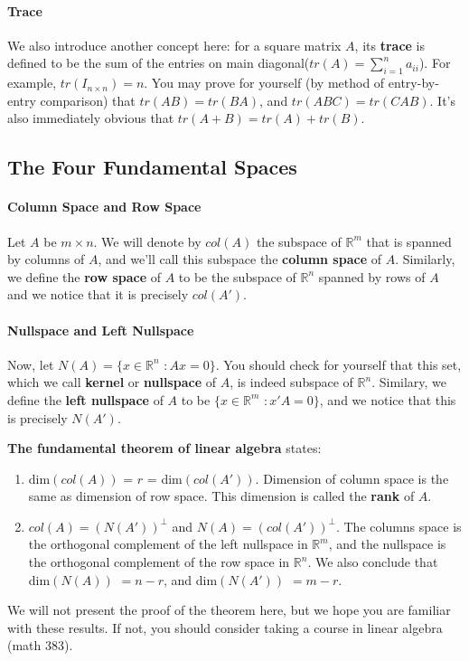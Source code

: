 \documentclass[12pt,oneside]{article}
\begin{document}
\paragraph{Trace}
We also introduce another concept here: for a square matrix $A$, its \textbf{trace} is defined to be the sum of the entries on main diagonal($tr(A) = \displaystyle\sum_{i=1}^{n} {a_{ii}}$). For example, $tr(I_{n \times n}) = n$. You may prove for yourself (by method of entry-by-entry comparison) that $tr(AB) = tr(BA)$, and $tr(ABC) = tr(CAB)$. It's also immediately obvious that $tr(A+B) = tr(A) + tr(B)$.

\subsection{The Four Fundamental Spaces}
\paragraph{Column Space and Row Space}
Let $A$ be $m \times n$. We will denote by $col(A)$ the subspace of
${\mathbb{R}}^m$ that is spanned by columns of $A$, and we'll call
this subspace the \textbf{column space} of $A$. Similarly, we define the
\textbf{row space} of $A$ to be the subspace of ${\mathbb{R}}^n$
spanned by rows of $A$ and we notice that it is precisely
$col(A')$.

\paragraph{Nullspace and Left Nullspace}
Now, let $N(A) = \{x \in {\mathbb{R}}^n$ $: Ax = 0\}$. You should
check for yourself that this set, which we call \textbf{kernel} or
\textbf{nullspace} of $A$, is indeed subspace of
${\mathbb{R}}^n$. Similary, we define the \textbf{left nullspace} of
$A$ to be $\{x \in {\mathbb{R}}^m$ $: x'A = 0\}$, and we notice that
this is precisely $N(A')$.

\textbf{The fundamental theorem of linear algebra} states:
\begin{enumerate}
\item dim$(col(A))$ = $r$ = dim$(col(A'))$. Dimension of column space
  is the same as dimension of row space. This dimension is called the
  \textbf{rank} of $A$.
\item $col(A) = {(N(A'))}^\perp$ and $N(A) = {(col(A'))}^\perp$. The
  columns space is the orthogonal complement of the left nullspace in
  ${\mathbb{R}}^m$, and the nullspace is the orthogonal complement of
  the row space in ${\mathbb{R}}^n$. We also conclude that dim$(N(A))$
  $= n - r$, and dim$(N(A'))$ $= m - r$.
\end{enumerate}
We will not present the proof of the theorem here, but we hope you are
familiar with these results. If not, you should consider taking a
course in linear algebra (math 383).
\end{document}
